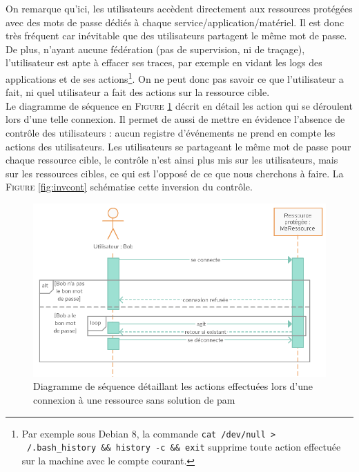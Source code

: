 On remarque qu'ici, les utilisateurs accèdent directement aux ressources protégées avec des mots de passe dédiés à chaque service/application/matériel. Il est donc très fréquent car inévitable que des utilisateurs partagent le même mot de passe. De plus, n'ayant aucune fédération (pas de supervision, ni de traçage), l'utilisateur est apte à effacer ses traces, par exemple en vidant les logs des applications et de ses actions\footnote{Par exemple sous Debian 8, la commande \texttt{cat /dev/null > ~/.bash\_history \&\& history -c \&\& exit} supprime toute action effectuée sur la machine avec le compte courant.}. On ne peut donc pas savoir ce que l'utilisateur a fait, ni quel utilisateur a fait des actions sur la ressource cible.\\
Le diagramme de séquence en \textsc{Figure} \ref{fig:diagseq_sans_PAM} décrit en détail les action qui se déroulent lors d'une telle connexion. Il permet de aussi de mettre en évidence l'absence de contrôle des utilisateurs : aucun registre d’événements ne prend en compte les actions des utilisateurs. Les utilisateurs se partageant le même mot de passe pour chaque ressource cible, le contrôle n'est ainsi plus mis sur les utilisateurs, mais sur les ressources cibles, ce qui est l'opposé de ce que nous cherchons à faire. La \textsc{Figure} \ref{fig:invcont} schématise cette inversion du contrôle. 

\begin{figure}[!ht]
    \center
    \includegraphics[width=\textwidth]{./images/Sequence_noPAM_use.png}
    \caption{Diagramme de séquence détaillant les actions effectuées lors d'une connexion à une ressource sans solution de \gls{pam}}
    \label{fig:diagseq_sans_PAM}
\end{figure}

